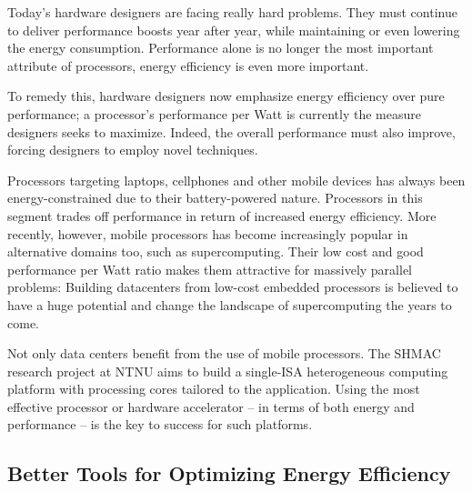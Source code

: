 Today's hardware designers are facing really hard problems. They must
continue to deliver performance boosts year after year, while maintaining
or even lowering the energy consumption. Performance alone is no longer the most
important attribute of processors, energy efficiency is even more important.


To remedy this, hardware designers now emphasize energy efficiency over pure
performance; a processor's performance per Watt is currently the measure
designers seeks to maximize. Indeed, the overall performance must also improve,
forcing designers to employ novel techniques.


Processors targeting laptops, cellphones and other mobile devices has always
been energy-constrained due to their battery-powered nature. Processors in this
segment trades off performance in return of increased energy efficiency. More
recently, however, mobile processors has become increasingly popular in
alternative domains too, such as supercomputing. Their low cost and good
performance per Watt ratio makes them attractive for massively parallel
problems: Building datacenters from low-cost embedded processors is believed to
have a huge potential and change the landscape of supercomputing the years to
come.


Not only data centers benefit from the use of mobile processors. The SHMAC
research project at NTNU aims to build a single-ISA heterogeneous computing
platform with processing cores tailored to the application. Using the most
effective processor or hardware accelerator -- in terms of both energy
and performance -- is the key to success for such platforms.



\subsection{Better Tools for Optimizing Energy Efficiency}

